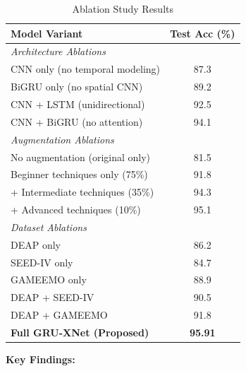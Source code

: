 \documentclass[conference]{IEEEtran}
\begin{document}
\begin{table}[!htbp]
\centering
\caption{Ablation Study Results}
\label{tab:ablation}
\begin{tabular}{lc}
\toprule
\textbf{Model Variant} & \textbf{Test Acc (\%)} \\
\midrule
\multicolumn{2}{l}{\textit{Architecture Ablations}} \\
CNN only (no temporal modeling) & 87.3 \\
BiGRU only (no spatial CNN) & 89.2 \\
CNN + LSTM (unidirectional) & 92.5 \\
CNN + BiGRU (no attention) & 94.1 \\
\midrule
\multicolumn{2}{l}{\textit{Augmentation Ablations}} \\
No augmentation (original only) & 81.5 \\
Beginner techniques only (75\%) & 91.8 \\
+ Intermediate techniques (35\%) & 94.3 \\
+ Advanced techniques (10\%) & 95.1 \\
\midrule
\multicolumn{2}{l}{\textit{Dataset Ablations}} \\
DEAP only & 86.2 \\
SEED-IV only & 84.7 \\
GAMEEMO only & 88.9 \\
DEAP + SEED-IV & 90.5 \\
DEAP + GAMEEMO & 91.8 \\
\midrule
\textbf{Full GRU-XNet (Proposed)} & \textbf{95.91} \\
\bottomrule
\end{tabular}
\end{table}

\textbf{Key Findings:}
\end{document}
